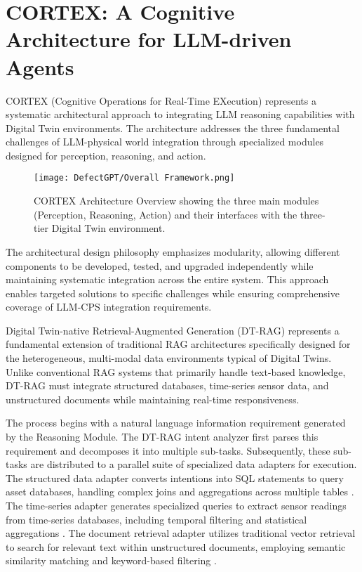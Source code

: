 \section{CORTEX: A Cognitive Architecture for LLM-driven Agents}

CORTEX (Cognitive Operations for Real-Time EXecution) represents a systematic architectural approach to integrating LLM reasoning capabilities with Digital Twin environments. The architecture addresses the three fundamental challenges of LLM-physical world integration through specialized modules designed for perception, reasoning, and action.

\begin{figure}[htbp]
\centering
\texttt{[image: DefectGPT/Overall Framework.png]}
\caption{CORTEX Architecture Overview showing the three main modules (Perception, Reasoning, Action) and their interfaces with the three-tier Digital Twin environment.}
\label{fig:architecture_overview}
\end{figure}

The architectural design philosophy emphasizes modularity, allowing different components to be developed, tested, and upgraded independently while maintaining systematic integration across the entire system. This approach enables targeted solutions to specific challenges while ensuring comprehensive coverage of LLM-CPS integration requirements.

Digital Twin-native Retrieval-Augmented Generation (DT-RAG) represents a fundamental extension of traditional RAG architectures specifically designed for the heterogeneous, multi-modal data environments typical of Digital Twins. Unlike conventional RAG systems that primarily handle text-based knowledge, DT-RAG must integrate structured databases, time-series sensor data, and unstructured documents while maintaining real-time responsiveness.

The process begins with a natural language information requirement generated by the Reasoning Module. The DT-RAG intent analyzer first parses this requirement and decomposes it into multiple sub-tasks. Subsequently, these sub-tasks are distributed to a parallel suite of specialized data adapters for execution. The structured data adapter converts intentions into SQL statements to query asset databases, handling complex joins and aggregations across multiple tables \cite{scholak2021duorat}. The time-series adapter generates specialized queries to extract sensor readings from time-series databases, including temporal filtering and statistical aggregations \cite{yue2022ts2vec}. The document retrieval adapter utilizes traditional vector retrieval to search for relevant text within unstructured documents, employing semantic similarity matching and keyword-based filtering \cite{karpukhin2020dense}.

